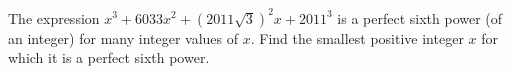 The expression $x^3+6033x^2+\left(2011\sqrt3\right)^2x+2011^3$ is a perfect sixth power (of an integer) for many integer values of $x$. Find the smallest positive integer $x$ for which it is a perfect sixth power.
